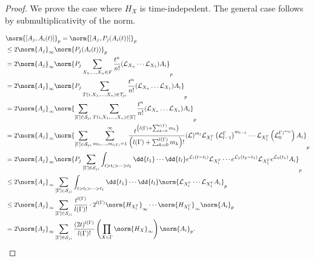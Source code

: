 \begin{proof}
    We prove the case where \(H_X\) is time-indepedent. The general case follows by submultiplicativity of the norm.
    
    \begin{align*}
      &\norm{[A_j,A_i(t)]}_{p} = \norm{[A_j,P_j(A_i(t))]}_{p} \\
                              &\leq 2 \norm{A_j}_{\infty} \norm{P_j(A_i(t))}_{p} \\
                              &= 2 \norm{A_j}_{\infty } \norm{P_j \sum_{X_1,\dots,X_n\in F}^{} \frac{t^{n}}{n!}(\mathcal{L}_{X_n} \cdots \mathcal{L}_{X_1})A_i }_p \\
                              &= 2 \norm{A_j}_{\infty} \norm{P_j \sum_{T(i,X_1,\dots,X_n)\in \mathcal{T}_{ji}}^{} \frac{t^{n}}{n!} (\mathcal{L}_{X_n} \dots \mathcal{L}_{X_1})A_i}_{p}\\
                              &= 2 \norm{A_j}_{\infty } \norm{\sum_{{[\Gamma ]\in \mathcal{S}_{ji}}} \sum_{{T(i,X_1,\dots,X_n)\in [\Gamma] } } \frac{t^{n}}{n!} (\mathcal{L}_{X_n}\dots \mathcal{L}_{X_1})A_i }_p \\
                              &= 2 \norm{A_j}_{\infty } \norm{ \sum_{[\Gamma ] \in \mathcal{S}_{ji}}^{}  \sum_{m_0,\dots,m_{l(\Gamma) }=1}^{\infty}  \frac{t^{ \left(l(\Gamma )+\sum_{k=0}^{l(\Gamma ) }m_k \right)}}{ \left(l(\Gamma ) + \sum_{k=0}^{l(\Gamma )} m_k \right)!} (\mathcal{L})^{m_l} \mathcal{L}_{X_l^{\Gamma }} \left(\mathcal{L}_{l-1}^{\Gamma }\right)^{m_{l-1}} \cdots \mathcal{L}_{X_1^{\Gamma }} \left(\mathcal{L}_0^{\Gamma )^{m_0}}\right)A_i}_{p} \\
                              &= 2 \norm{A_j}_{\infty } \norm{P_j \sum_{[\Gamma ] \in \mathcal{S}_{ji}}^{}  \int_{t>t_l >\dots > t_1}^{}  \dd{t_1} \cdots \dd{t_l} e^{\mathcal{L}_{l}(t-t_l)} \mathcal{L}_{X_l^{\Gamma }} \cdots e^{\mathcal{L}_1 (t_2-t_1)} \mathcal{L}_{X_1^{\Gamma }} e^{ \mathcal{L}_0 (t_1)}A_i}_{p} \\
                              &\leq 2 \norm{A_j}_{\infty} \sum_{[\Gamma ] \in \mathcal{S}_{ji}}^{}  \int_{t>t_l > \dots >t_1}^{}  \dd{t_1} \cdots \dd{t_l} \norm{\mathcal{L}_{X_l^{\Gamma }} \cdots \mathcal{L}_{X_1^{\Gamma }}A_i}_p \\ 
                              &\leq 2 \norm{A_j}_{\infty } \sum_{[\Gamma ] \in \mathcal{S}_{ji}}^{}  \frac{t^{l(\Gamma )}}{l(\Gamma )!} \cdot 2^{l(\Gamma )} \norm{H_{X_l^{\Gamma }}}_{\infty } \cdots \norm{H_{X_1^{\Gamma }}}_{\infty} \norm{A_i}_p \\
                              &=2 \norm{A_j}_{\infty }\sum_{[\Gamma ] \in \mathcal{S}_{ji}}^{}  \frac{(2t)^{l(\Gamma )}}{l(\Gamma ) !} \left(\prod_{X \in \Gamma }^{} \norm{H_X}_{\infty } \right)\norm{A_i}_{p}.
    \end{align*}
\end{proof}


